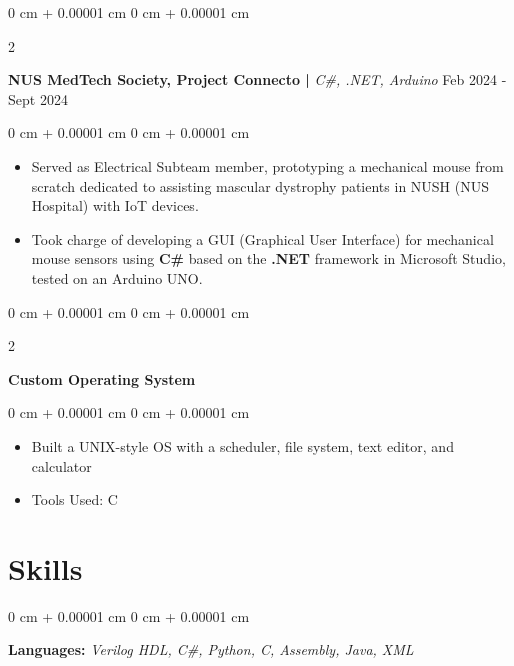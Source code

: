 \documentclass[10pt, letterpaper]{article}
\newenvironment{highlights}{
    \begin{itemize}[
        topsep=0.10 cm,
        parsep=0.10 cm,
        partopsep=0pt,
        itemsep=0pt,
        leftmargin=0 cm + 10pt
    ]
}{
    \end{itemize}
} %
\newenvironment{onecolentry}{
    \begin{adjustwidth}{
        0 cm + 0.00001 cm
    }{
        0 cm + 0.00001 cm
    }
}{
    \end{adjustwidth}
} %
\newenvironment{twocolentry}[2][]{
    \onecolentry
    \def\secondColumn{#2}
    \setcolumnwidth{\fill, 4.5 cm}
    \begin{paracol}{2}
}{
    \switchcolumn \raggedleft \secondColumn
    \end{paracol}
    \endonecolentry
} %
\begin{document}
        \vspace{0.2 cm}
        \begin{twocolentry}{
            Feb 2024 - Sept 2024 
        }
            \textbf{NUS MedTech Society, Project Connecto |} \textit{C#, .NET, Arduino}\end{twocolentry}
        \vspace{0.10 cm}
        \begin{onecolentry}
            \begin{highlights}
                \item Served as Electrical Subteam member, prototyping a mechanical mouse from scratch dedicated to assisting mascular dystrophy patients in NUSH (NUS Hospital) with IoT devices.
                \item  Took charge of developing a GUI (Graphical User Interface) for mechanical mouse sensors using \textbf{C#} based on the \textbf{.NET} framework in Microsoft Studio, tested on an Arduino UNO.
            \end{highlights}
        \end{onecolentry}


        \vspace{0.2 cm}

        \begin{twocolentry}{
            2002
        }
            \textbf{Custom Operating System}\end{twocolentry}

        \vspace{0.10 cm}
        \begin{onecolentry}
            \begin{highlights}
                \item Built a UNIX-style OS with a scheduler, file system, text editor, and calculator
                \item Tools Used: C
            \end{highlights}
        \end{onecolentry}



    
    \section{Skills}
        
        \begin{onecolentry}
            \textbf{Languages:} \textit{Verilog HDL, C#, Python, C, Assembly, Java, XML }\end{onecolentry}
\end{document}
